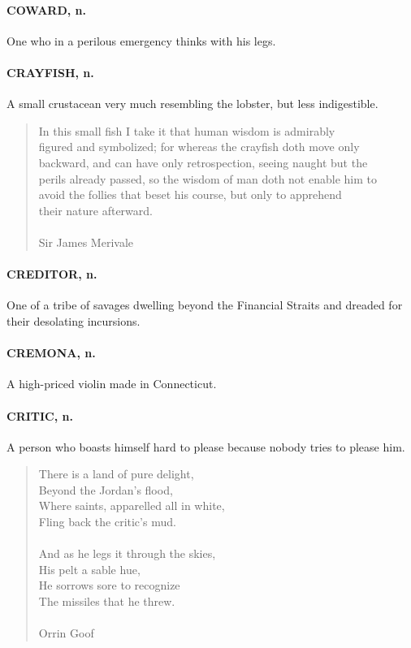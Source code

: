 \documentclass[11pt]{article}
\begin{document}
\paragraph{COWARD, n.}  One who in a perilous emergency thinks with his legs.

\paragraph{CRAYFISH, n.}  A small crustacean very much resembling the lobster, but
less indigestible.

\begin{quote}       In this small fish I take it that human wisdom is admirably \\
  figured and symbolized; for whereas the crayfish doth move only \\
  backward, and can have only retrospection, seeing naught but the \\
  perils already passed, so the wisdom of man doth not enable him to \\
  avoid the follies that beset his course, but only to apprehend \\
  their nature afterward. \\
 \\
Sir James Merivale \end{quote}


\paragraph{CREDITOR, n.}  One of a tribe of savages dwelling beyond the Financial
Straits and dreaded for their desolating incursions.

\paragraph{CREMONA, n.}  A high-priced violin made in Connecticut.

\paragraph{CRITIC, n.}  A person who boasts himself hard to please because nobody
tries to please him.

\begin{quote}   There is a land of pure delight, \\
      Beyond the Jordan's flood, \\
  Where saints, apparelled all in white, \\
      Fling back the critic's mud. \\
 \\
  And as he legs it through the skies, \\
      His pelt a sable hue, \\
  He sorrows sore to recognize \\
      The missiles that he threw. \\
 \\
Orrin Goof \end{quote}
\end{document}
